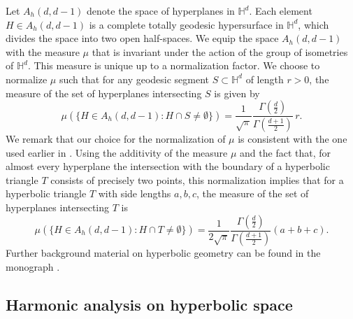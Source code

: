 \documentclass[11pt,a4paper]{article}
\theoremstyle{plain}
\theoremstyle{definition}
\theoremstyle{remark}
\begin{document}
Let $A_h(d, d-1)$ denote the space of hyperplanes in $\mathbb{H}^d$. Each element $H \in A_h(d, d-1)$ is a complete totally geodesic hypersurface in $\mathbb{H}^d$, which divides the space into two open half-spaces. We equip the space $A_h(d, d-1)$ with the measure $\mu$ that is invariant under the action of the group of isometries of $\mathbb{H}^d$. This measure is unique up to a normalization factor. We choose to normalize $\mu$ such that for any geodesic segment $S \subset \mathbb{H}^d$ of length $r>0$, the measure of the set of hyperplanes intersecting $S$ is given by
\begin{equation*}
	\mu(\{H \in A_h(d, d-1) : H \cap S \neq \emptyset\}) = \frac{1}{\sqrt{\pi}} \frac{\Gamma(\frac{d}{2})}{\Gamma(\frac{d+1}{2})}\, r.
\end{equation*}
We remark that our choice for the normalization of $\mu$ is consistent with the one used earlier in \cite{BuehlerHugThaeleBM,GodlandKabluchkoThaeleBetaStar,HeroldHugThaele,HS}. Using the additivity of the measure $\mu$ and the fact that, for almost every hyperplane the intersection with the boundary of a hyperbolic triangle \(T\) consists of precisely two points, this normalization implies that for a hyperbolic triangle \(T\) with side lengths \(a,b,c\), the measure of the set of hyperplanes intersecting \(T\) is
\begin{equation}\label{eq:CroftonTriangle}
\mu(\{H \in A_h(d, d-1) : H \cap T \neq \emptyset\}) = \frac{1}{2\sqrt{\pi}} \frac{\Gamma(\frac{d}{2})}{\Gamma(\frac{d+1}{2})} (a+b+c).    
\end{equation}
Further background material on hyperbolic geometry can be found in the monograph \cite{Ratcliffe}.


\subsection{Harmonic analysis on hyperbolic space}
\end{document}
